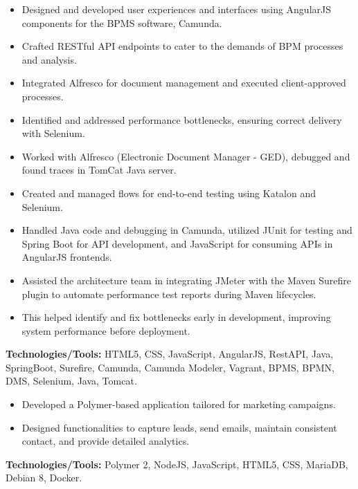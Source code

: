 \documentclass[10pt,a4paper]{altacv}
\begin{document}
\begin{itemize}
    \setlength{\itemindent}{0.5em}
    \item[--] Designed and developed user experiences and interfaces using AngularJS components for the BPMS software, Camunda.
    \item[--] Crafted RESTful API endpoints to cater to the demands of BPM processes and analysis.
    \item[--] Integrated Alfresco for document management and executed client-approved processes.
    \item[--] Identified and addressed performance bottlenecks, ensuring correct delivery with Selenium.
    \item[--] Worked with Alfresco (Electronic Document Manager - GED), debugged and found traces in TomCat Java server.
    \item[--] Created and managed flows for end-to-end testing using Katalon and Selenium.
    \item[--] Handled Java code and debugging in Camunda, utilized JUnit for testing and Spring Boot for API development, and JavaScript for consuming APIs in AngularJS frontends.
    \item[--] Assisted the architecture team in integrating JMeter with the Maven Surefire plugin to automate performance test reports during Maven lifecycles.
    \item[--] This helped identify and fix bottlenecks early in development, improving system performance before deployment.
\end{itemize}
\textbf{Technologies/Tools:} HTML5, CSS, JavaScript, AngularJS, RestAPI, Java, SpringBoot, Surefire, Camunda, Camunda Modeler, Vagrant, BPMS, BPMN, DMS, Selenium, Java, Tomcat.
\vspace{5mm}

\begin{itemize}
    \setlength{\itemindent}{0.5em}
    \item[--] Developed a Polymer-based application tailored for marketing campaigns.
    \item[--] Designed functionalities to capture leads, send emails, maintain consistent contact, and provide detailed analytics.
\end{itemize}
\textbf{Technologies/Tools:} Polymer 2, NodeJS, JavaScript, HTML5, CSS, MariaDB, Debian 8, Docker.
\vspace{5mm}
\end{document}
